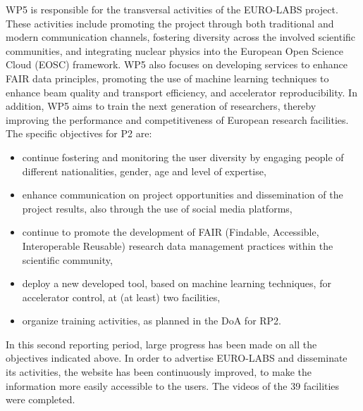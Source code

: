  WP5 
 is responsible for the transversal activities of the EURO-LABS project. These activities include promoting the project through both traditional and modern communication channels, fostering diversity across the involved scientific communities, and integrating nuclear physics into the European Open Science Cloud (EOSC) framework. WP5 also focuses on developing services to enhance FAIR data principles, promoting the use of machine learning techniques to enhance beam quality and transport efficiency, and accelerator reproducibility. In addition, WP5 aims to train the next generation of researchers, thereby improving the performance and competitiveness of European research facilities.
 The specific objectives for P2 are: 
\begin{itemize}
    \item continue fostering and monitoring the user diversity by engaging people of different nationalities, gender, age and level of expertise,
    \item enhance communication on project opportunities and dissemination of the project results, also through the use of social media platforms,
    \item continue to promote the development of FAIR (Findable, Accessible, Interoperable Reusable) research data management practices within the scientific community,
    \item deploy a  new developed tool, based on machine learning techniques, for accelerator control, at (at least) two facilities,
    \item organize training activities, as planned in the DoA for RP2.
\end{itemize}
In this second reporting period, large progress has been made on all the objectives indicated above. In order to advertise EURO-LABS and disseminate its activities, the website has been continuously improved, to make the information more easily accessible to the users.  
The videos of the  39 facilities were completed. 
